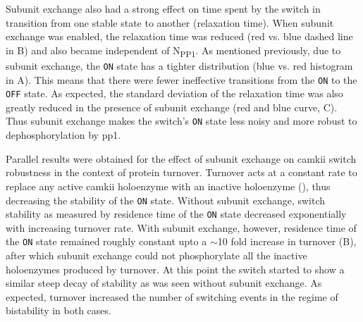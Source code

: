 \documentclass[9pt,lineno,doublespacing]{elife}
\newcommand\SUB[2]{#1\textsubscript{#2}}
\begin{document}
Subunit exchange also had a strong effect on time spent by the switch in
transition from one stable state to another (relaxation time). When subunit
exchange was enabled, the relaxation time was reduced (red vs. blue dashed line
in B) and also became independent of \SUB{N}{PP1}. As
mentioned previously, due to subunit exchange, the \texttt{ON} state has a
tighter distribution (blue vs. red histogram in A). This
means that there were fewer ineffective transitions from the \texttt{ON} to the
\texttt{OFF} state. As expected, the standard deviation of the relaxation time
was also greatly reduced in the presence of subunit exchange (red and blue
curve, C). Thus subunit exchange makes the switch's
\texttt{ON} state less noisy and more robust to dephosphorylation by \gls{pp1}.

Parallel results were obtained for the effect of subunit exchange on
\gls{camkii} switch robustness in the context of protein turnover. Turnover acts
at a constant rate to replace any active \gls{camkii} holoenzyme with an
inactive holoenzyme (), thus decreasing the stability of the
\texttt{ON} state. Without subunit exchange, switch stability as measured by
residence time of the \texttt{ON} state decreased exponentially with increasing
turnover rate.  With subunit exchange, however, residence time of the
\texttt{ON} state remained roughly constant upto a $\sim$10 fold increase in
turnover (B), after which subunit exchange could not phosphorylate
all the inactive holoenzymes produced by turnover. At this point the switch
started to show a similar steep decay of stability as was seen without subunit
exchange. As expected, turnover increased the number of switching events in the
regime of bistability in both cases.
\end{document}

